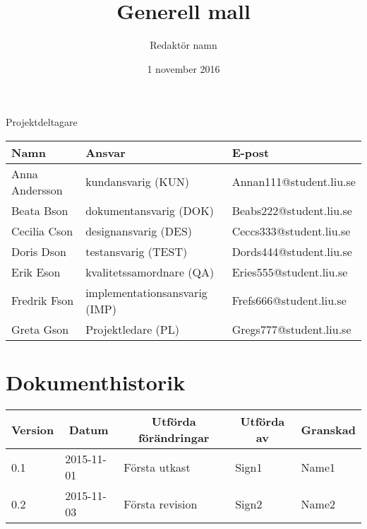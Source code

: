 \documentclass[10pt,oneside,swedish]{lips-no_customer}
\title{Generell mall}
\author{Redaktör namn}
\date{1 november 2016}
\begin{document}
\maketitle

\cleardoublepage
\makeprojectid

\begin{center}
  \Large Projektdeltagare
\end{center}
\begin{center}
  \begin{tabular}{|l|l|l|}
    \hline
    \textbf{Namn} & \textbf{Ansvar} & \textbf{E-post}\\
    \hline
    Anna Andersson & kundansvarig (KUN) & Annan111@student.liu.se\\
    \hline
    Beata Bson & dokumentansvarig (DOK) & Beabs222@student.liu.se\\
    \hline
    Cecilia Cson & designansvarig (DES) & Ceccs333@student.liu.se\\
    \hline
    Doris Dson & testansvarig (TEST) & Dords444@student.liu.se\\
    \hline
    Erik Eson & kvalitetssamordnare (QA) & Eries555@student.liu.se\\
    \hline
    Fredrik Fson & implementationsansvarig (IMP) & Frefs666@student.liu.se\\
    \hline
    Greta Gson & Projektledare (PL) & Gregs777@student.liu.se\\
    \hline
  \end{tabular}
\end{center}


\cleardoublepage
\tableofcontents

\cleardoublepage
\section*{Dokumenthistorik}
\begin{tabular}{p{}|p{}|p{}|p{}|p{}} 
  \multicolumn{1}{c}{\bfseries Version} & 
  \multicolumn{1}{|c}{\bfseries Datum} & 
  \multicolumn{1}{|c}{\bfseries Utförda förändringar} & 
  \multicolumn{1}{|c}{\bfseries Utförda av} & 
  \multicolumn{1}{|c}{\bfseries Granskad}\\
  \hline
  \hline
  0.1 & 2015-11-01 & Första utkast & Sign1 & Name1   \\
  \hline
  0.2 & 2015-11-03 & Första revision & Sign2 & Name2   \\
  \hline
\end{tabular}
\end{document}
